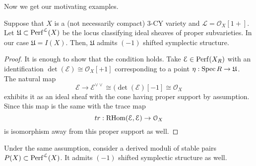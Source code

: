 Now we get our motivating examples.
\begin{cor}
    Suppose that $X$ is a (not necessarily compact) 3-CY variety and $\mathcal{L}=\mathcal{O}_X[1+]$. Let $\mathfrak{U} \subset \mathrm{Perf}^{\mathcal{L}}(X)$ be the locus classifying ideal sheaves of proper subvarieties. In our case $\mathfrak{U}=I(X)$. Then, $\mathfrak{U}$ admits $(-1)$ shifted symplectic structure.
\end{cor}
\begin{proof}
    It is enough to show that the condition holds. Take $\mathcal{E} \in \mathrm{Perf}(X_R)$ with an identification $\det(\mathcal{E}) \cong \mathcal{O}_X[+1]$ corresponding to a point $\eta: \operatorname{Spec} R \to \mathfrak{U}$. The natural map 
    \begin{equation*}
        \mathcal{E} \to \mathcal{E}^{\vee\vee} \cong (\det(\mathcal{E})[-1] \cong \mathcal{O}_X
    \end{equation*}
    exhibits it as an ideal sheaf with the cone having proper support by assumption. Since this map is the same with the trace map 
    \begin{equation*}
        tr: \operatorname{RHom}(\mathcal{E}, \mathcal{E}) \to \mathcal{O}_X
    \end{equation*}
    is isomorphism away from this proper support as well.
\end{proof}
\begin{cor}
    Under the same assumption, consider a derived moduli of stable pairs $P(X) \subset \mathrm{Perf}^{\mathcal{L}}(X)$. It admits $(-1)$ shifted symplectic structure as well. 
\end{cor}

